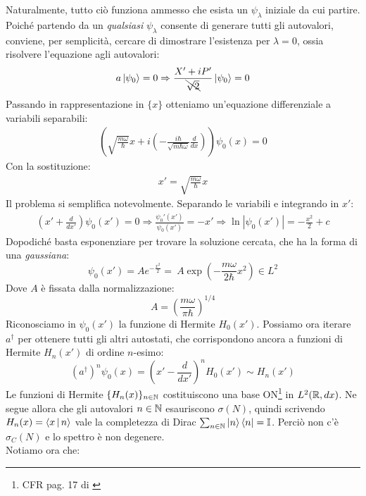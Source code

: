 \documentclass[../../FisicaTeorica.tex]{subfiles}
\begin{document}
Naturalmente, tutto ciò funziona ammesso che esista un $\psi_\lambda$ iniziale da cui partire. Poiché partendo da un \textit{qualsiasi} $\psi_\lambda$ consente di generare tutti gli autovalori, conviene, per semplicità, cercare di dimostrare l'esistenza per $\lambda=0$, ossia risolvere l'equazione agli autovalori:
\begin{align*}
a\Ket{\psi_0} = 0 \Rightarrow \frac{X'+iP'}{\bcancel{\sqrt{2}}} \Ket{\psi_0} = 0
\end{align*}
Passando in rappresentazione in $\{x\}$ otteniamo un'equazione differenziale a variabili separabili:
\begin{align*}
\left(\sqrt{\frac{m\omega}{\hbar}}
x+i\left(-\frac{i\hbar}{\sqrt{m\hbar \omega}}\frac{d}{dx} \right)
\right)\psi_0(x) =0
\end{align*}
Con la sostituzione:
\begin{align*}
x'=\sqrt{\frac{m\omega}{\hbar}}x
\end{align*}
Il problema si semplifica notevolmente. Separando le variabili e integrando in $x'$:
\begin{align*}
\left(x'+\frac{d}{dx'}\right)\psi_0 (x') = 0 \Rightarrow \frac{\psi_0'(x')}{\psi_0(x')}=-x' \Rightarrow \ln|\psi_0(x')|=-\frac{x^2}{2}+c
\end{align*}
Dopodiché basta esponenziare per trovare la soluzione cercata, che ha la forma di una \textit{gaussiana}:
\[
\psi_0(x') = Ae^{-\frac{x^2}{2}} =\ A \exp\left(-\frac{m\omega}{2\hbar}x^2\right) \in L^2
\]
Dove $A$ è fissata dalla normalizzazione:
\[
A = \left(\frac{m\omega}{\pi \hbar}\right)^{1/4}
\]
Riconosciamo in $\psi_0(x')$ la funzione di Hermite $H_0(x')$. Possiamo ora iterare  $a^\dag$ per ottenere tutti gli altri autostati, che corrispondono ancora a funzioni di Hermite $H_n(x')$ di ordine $n$-esimo:
\[
(a^\dag)^n \psi_0(x) = \left(x'-\frac{d}{dx'}\right)^n H_0(x') \sim H_n(x')
\]
Le funzioni di Hermite $\{H_n(x)\}_{n\in \mathbb{N}}$ costituiscono una base ON\footnote{CFR pag. 17 di \cite{spazi_hilbert}} in $L^2(\mathbb{R},dx)$. Ne segue allora che gli autovalori $n\in \mathbb{N}$ esauriscono $\sigma(N)$, quindi scrivendo $H_n(x)=\Braket{x|n}$ vale la completezza di Dirac $\sum_{n\in \mathbb{N}}\Ket{n}\Bra{n}=\mathbb{I}$. Perciò non c'è $\sigma_C(N)$ e lo spettro è non degenere.\\
Notiamo ora che:
\end{document}
